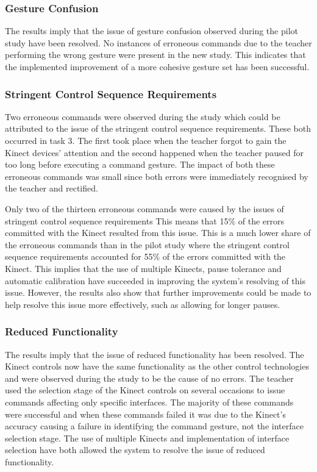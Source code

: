 \documentclass[link]{IWCOMP}
\begin{document}
\subsubsection{Gesture Confusion}
\label{subsubsec:discussionResolutionGestureConfusion}

The results imply that the issue of gesture confusion observed during the pilot study have been resolved.
No instances of erroneous commands due to the teacher performing the wrong gesture were present in the new study.
This indicates that the implemented improvement of a more cohesive gesture set has been successful.

\subsubsection{Stringent Control Sequence Requirements}
\label{subsubsec:discussionResolutionStringentControlSequenceRequirements}

Two erroneous commands were observed during the study which could be attributed to the issue of the stringent control sequence requirements.
These both occurred in task 3.
The first took place when the teacher forgot to gain the Kinect devices' attention and the second happened when the teacher paused for too long before executing a command gesture.
The impact of both these erroneous commands was small since both errors were immediately recognised by the teacher and rectified.

Only two of the thirteen erroneous commands were caused by the issues of stringent control sequence requirements
This means that 15\% of the errors committed with the Kinect resulted from this issue.
This is a much lower share of the erroneous commands than in the pilot study where the stringent control sequence requirements accounted for 55\% of the errors committed with the Kinect.
This implies that the use of multiple Kinects, pause tolerance and automatic calibration have succeeded in improving the system's resolving of this issue.
However, the results also show that further improvements could be made to help resolve this issue more effectively, such as allowing for longer pauses.

\subsubsection{Reduced Functionality}
\label{subsubsec:discussionResolutionReducedFunctionality}
 
The results imply that the issue of reduced functionality has been resolved.
The Kinect controls now have the same functionality as the other control technologies and were observed during the study to be the cause of no errors.
The teacher used the selection stage of the Kinect controls on several occasions to issue commands affecting only specific interfaces.
The majority of these commands were successful and when these commands failed it was due to the Kinect's accuracy causing a failure in identifying the command gesture, not the interface selection stage.
The use of multiple Kinects and implementation of interface selection have both allowed the system to resolve the issue of reduced functionality.
\end{document}
